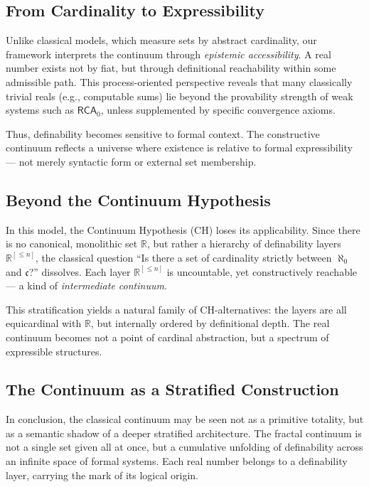 \documentclass[12pt]{article}
\theoremstyle{definition}
\theoremstyle{plain}
\theoremstyle{remark}
\begin{document}
\subsection*{From Cardinality to Expressibility}

Unlike classical models, which measure sets by abstract cardinality, our framework interprets the continuum through \emph{epistemic accessibility}. A real number exists not by fiat, but through definitional reachability within some admissible path. This process-oriented perspective reveals that many classically trivial reals (e.g., computable sums) lie beyond the provability strength of weak systems such as \( \mathsf{RCA}_0 \), unless supplemented by specific convergence axioms.

Thus, definability becomes sensitive to formal context. The constructive continuum reflects a universe where existence is relative to formal expressibility — not merely syntactic form or external set membership.

\subsection*{Beyond the Continuum Hypothesis}

In this model, the Continuum Hypothesis (CH) loses its applicability. Since there is no canonical, monolithic set \( \mathbb{R} \), but rather a hierarchy of definability layers \( \mathbb{R}^{[\leq n]} \), the classical question “Is there a set of cardinality strictly between \( \aleph_0 \) and \( \mathfrak{c} \)?” dissolves. Each layer \( \mathbb{R}^{[\leq n]} \) is uncountable, yet constructively reachable — a kind of \emph{intermediate continuum}.

This stratification yields a natural family of CH-alternatives: the layers are all equicardinal with \( \mathbb{R} \), but internally ordered by definitional depth. The real continuum becomes not a point of cardinal abstraction, but a spectrum of expressible structures.

\subsection*{The Continuum as a Stratified Construction}

In conclusion, the classical continuum may be seen not as a primitive totality, but as a semantic shadow of a deeper stratified architecture. The fractal continuum is not a single set given all at once, but a cumulative unfolding of definability across an infinite space of formal systems. Each real number belongs to a definability layer, carrying the mark of its logical origin.
\end{document}

